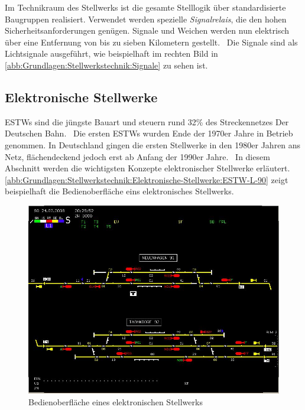 Im Technikraum des Stellwerks ist die gesamte Stelllogik über standardisierte Baugruppen realisiert. Verwendet werden spezielle \textit{Signalrelais}, die den hohen Sicherheitsanforderungen genügen. Signale und Weichen werden nun elektrisch über eine Entfernung von bis zu sieben Kilometern gestellt.~\cite{bib:DB:Stellwerke} Die Signale sind als Lichtsignale ausgeführt, wie beispielhaft im rechten Bild in \autoref{abb:Grundlagen:Stellwerkstechnik:Signale} zu sehen ist.

\subsection{Elektronische Stellwerke}\label{text:Grundlagen:Stellwerkstechnik:Elektronische-Stellwerke}

\acp{ESTW} sind die jüngste Bauart und steuern rund 32\% des Streckennetzes Der Deutschen Bahn.~\cite{bib:DB:Stellwerke} Die ersten \acp{ESTW} wurden Ende der 1970er Jahre in Betrieb genommen. In Deutschland gingen die ersten Stellwerke in den 1980er Jahren ans Netz, flächendeckend jedoch erst ab Anfang der 1990er Jahre.~\cite[][S.192 f.]{bib:Sicherung-des-Schienenverkehrs} In diesem Abschnitt werden die wichtigsten Konzepte elektronischer Stellwerke erläutert. \autoref{abb:Grundlagen:Stellwerkstechnik:Elektronische-Stellwerke:ESTW-L-90} zeigt beispielhaft die Bedienoberfläche eins elektronisches Stellwerks.

\begin{figure}[H]
    \centering
    \includegraphics[width=\textwidth]{Assets/Images/2-Grundlagen/ESTW-L-90.png}
    \caption{Bedienoberfläche eines elektronischen Stellwerks~\cite{bib:bild:wiki:EST-L-90}}\label{abb:Grundlagen:Stellwerkstechnik:Elektronische-Stellwerke:ESTW-L-90}
\end{figure}


